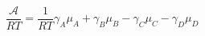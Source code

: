 \begin{equation}\label{eqn:reaction-affinity}
\frac{\mathcal{A}}{RT}=\frac{1}{RT}{{\gamma }_{A}}{{\mu }_{A}}+{{\gamma }_{B}}{{\mu }_{B}}-{{\gamma }_{C}}{{\mu }_{C}}-{{\gamma }_{D}}{{\mu }_{D}}
\end{equation}
